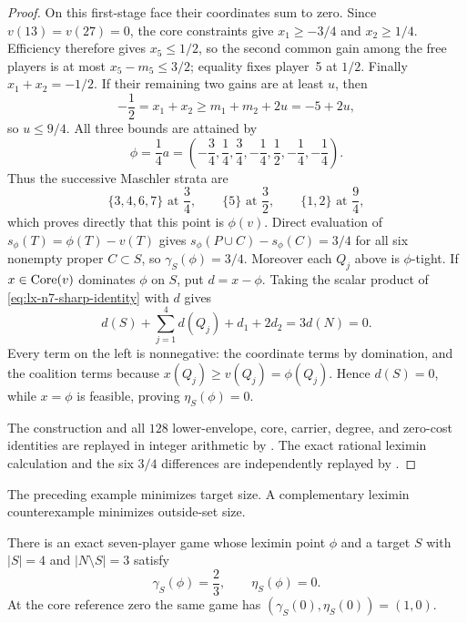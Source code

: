 \begin{proof}
On this first-stage face their coordinates sum to zero.  Since
$v(13)=v(27)=0$, the core constraints give $x_1\geq-3/4$ and
$x_2\geq1/4$.  Efficiency therefore gives $x_5\leq1/2$, so the second
common gain among the free players is at most $x_5-m_5\leq3/2$; equality
fixes player~5 at $1/2$.  Finally $x_1+x_2=-1/2$.  If their remaining two
gains are at least $u$, then
\[
 -\frac12=x_1+x_2\geq m_1+m_2+2u=-5+2u,
\]
so $u\leq9/4$.  All three bounds are attained by
\[
 \phi=\frac14a
 =\left(-\frac34,\frac14,\frac34,-\frac14,
          \frac12,-\frac14,-\frac14\right).
\]
Thus the successive Maschler strata are
\[
 \{3,4,6,7\}\text{ at }\frac34,\qquad
 \{5\}\text{ at }\frac32,\qquad
 \{1,2\}\text{ at }\frac94,
\]
which proves directly that this point is $\phi(v)$.
Direct evaluation of $s_\phi(T)=\phi(T)-v(T)$ gives
$s_\phi(P\cup C)-s_\phi(C)=3/4$ for all six nonempty proper
$C\subset S$, so $\gamma_S(\phi)=3/4$.  Moreover each $Q_j$ above is
$\phi$-tight.  If $x\in\operatorname{Core}(v)$ dominates $\phi$ on $S$, put
$d=x-\phi$.  Taking the scalar product of
\eqref{eq:lx-n7-sharp-identity} with $d$ gives
\[
 d(S)+\sum_{j=1}^4d(Q_j)+d_1+2d_2=3d(N)=0.
\]
Every term on the left is nonnegative: the coordinate terms by domination,
and the coalition terms because $x(Q_j)\geq v(Q_j)=\phi(Q_j)$.  Hence
$d(S)=0$, while $x=\phi$ is feasible, proving $\eta_S(\phi)=0$.

The construction and all $128$ lower-envelope, core, carrier, degree, and
zero-cost identities are replayed in integer arithmetic by
.  The exact rational
leximin calculation and the six $3/4$ differences are independently replayed
by .
\end{proof}

The preceding example minimizes target size.  A complementary leximin
counterexample minimizes outside-set size.

\begin{proposition}
\label{prop:lx-n7-outside-triple}
There is an exact seven-player game whose leximin point $\phi$ and a target
$S$ with $|S|=4$ and $|N\setminus S|=3$ satisfy
\[
 \gamma_S(\phi)=\frac23,
 \qquad
 \eta_S(\phi)=0.
\]
At the core reference zero the same game has
$(\gamma_S(0),\eta_S(0))=(1,0)$.
\end{proposition}

